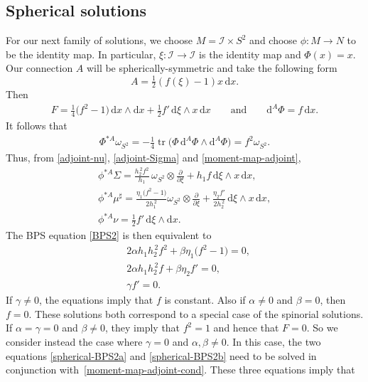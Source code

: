 \documentclass[10pt,a4paper]{amsart}
\newcommand{\II}{{\mathcal{I}}}
\newcommand{\1}{{\mathbb{1}}}
\newcommand{\bdy}{\partial}
\def \d{\mathrm{d}}
\newcommand{\tr}{{\operatorname{tr}}}
\numberwithin{equation}{section}
\begin{document}
\subsection{Spherical solutions}\label{sec:spherical}

For our next family of solutions, we choose $M=\II\times S^2$ and choose $\phi\colon M\to N$ to be the identity map. In particular, $\xi\colon \II\to\II$ is the identity map and $\Phi(x)=x$. Our connection $A$ will be spherically-symmetric and take the following form
\begin{equation}
\label{spherical-ansatz}
A = \tfrac12(f(\xi)-1) x\,\d x.
\end{equation}
Then
\begin{align*}
F = \tfrac14\bigl(f^2-1\bigr)\,\d x\wedge \d x +\tfrac{1}{2}f'\,\d\xi\wedge x\,\d x
\qquad\text{and}\qquad
\d^A\Phi = f\,\d x.
\end{align*}
It follows that
\begin{align*}
\Phi^{\ast A}\omega_{S^2}=-\tfrac14\tr\bigl(\Phi\,\d^A \Phi\wedge\d^A\Phi\bigr) = f^2\omega_{S^2}.
\end{align*}
Thus, from \eqref{adjoint-nu}, \eqref{adjoint-Sigma} and \eqref{moment-map-adjoint},
\begin{gather*}
\phi^{\ast A}\Sigma = \frac{h_2^{\,2}f^2}{h_1}\,\omega_{S^2}\otimes\frac{\bdy}{\bdy\xi}+h_1 f\,\d\xi\wedge x\,\d x, \\
\phi^{\ast A}\mu^\sharp = \frac{\eta_1\big(f^2-1\big)}{2h_1^{\,2}}\omega_{S^2}\otimes\frac{\bdy}{\bdy\xi} + \frac{\eta_2f'}{2h_2^{\,2}}\,\d\xi\wedge x\,\d x, \\
\phi^{\ast A}\nu = \tfrac{1}{2}f'\,\d\xi\wedge \d x.
\end{gather*}
The BPS equation \eqref{BPS2} is then equivalent to
\begin{align}
&2\alpha h_1h_2^{\,2}f^2+\beta\eta_1\big(f^2-1\big)=0, \label{spherical-BPS2a} \\
&2\alpha h_1h_2^{\,2}f+\beta\eta_2f'=0, \label{spherical-BPS2b}\\
&\gamma f' =0.\nonumber
\end{align}
If $\gamma\neq0$, the equations imply that $f$ is constant. Also if $\alpha\neq0$ and $\beta=0$, then $f=0$. These solutions both correspond to a special case of the spinorial solutions. If $\alpha=\gamma=0$ and $\beta\neq0$, they imply that $f^2=1$ and hence that $F=0$. So we consider instead the case where $\gamma=0$ and $\alpha,\beta\neq0$. In this case, the two equations \eqref{spherical-BPS2a} and \eqref{spherical-BPS2b} need to be solved in conjunction with~\eqref{moment-map-adjoint-cond}. These three equations imply that
\end{document}

